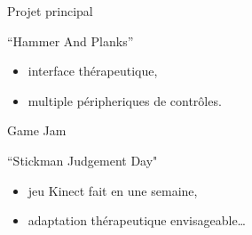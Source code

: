 \begin{frame}{Projet principal}
\begin{block}{``Hammer And Planks''}
\begin{itemize}
\item interface thérapeutique,
\item multiple péripheriques de contrôles.
\end{itemize}
\end{block}

\end{frame}

\begin{frame}{Game Jam}
\begin{block}{``Stickman Judgement Day"}
\begin{itemize}
\item jeu Kinect fait en une semaine,
\item adaptation thérapeutique envisageable\ldots
\end{itemize}
\end{block}

\end{frame}